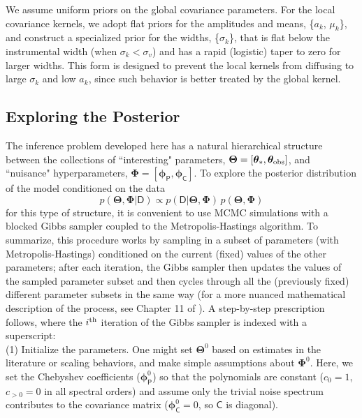 \documentclass[iop,floatfix]{emulateapj}
\newcommand{\vD}{\mathsf{D}}
\newcommand{\vC}{\mathsf{C}}
\newcommand{\vt}{ {\bm \theta}}
\newcommand{\vT}{ {\bm \Theta}}
\newcommand{\vp}{ {\bm \phi}}
\newcommand{\vP}{ {\bm \Phi}}
\newcommand{\cheb}{ \vp_{\mathsf{P}}}
\newcommand{\cov}{ \vp_{\mathsf{C}}}
\begin{document}
We assume uniform priors on the global covariance parameters.  For the local
covariance kernels, we adopt flat priors for the amplitudes and means, \{$a_k$,
$\mu_k$\}, and construct a specialized prior for the widths, \{$\sigma_k$\},
that is flat below the instrumental width (when $\sigma_k < \sigma_v$) and has
a rapid (logistic) taper to zero for larger widths.  This form is designed to
prevent the local kernels from diffusing to large $\sigma_k$ and low $a_k$,
since such behavior is better treated by the global kernel.  


\subsection{Exploring the Posterior} \label{subsec:MCMC}

The inference problem developed here has a natural hierarchical structure between the collections 
of ``interesting" parameters, $\vT = [\vt_{\ast}, \vt_{\rm obs}]$, and ``nuisance" hyperparameters, 
$\vP = [\cheb, \cov]$.  To explore the posterior distribution of the model conditioned on the data
\begin{equation} \label{eqn:post}
p(\vT, \vP | \vD) \propto p(\vD | \vT, \vP) \, p(\vT, \vP)
\end{equation}
for this type of structure, it is convenient to use MCMC simulations with a blocked Gibbs 
sampler coupled to the Metropolis-Hastings algorithm.  To summarize, this procedure works by 
sampling in a subset of parameters (with Metropolis-Hastings) conditioned on the current (fixed) 
values of the other parameters; after each iteration, the Gibbs sampler then updates the values of 
the sampled parameter subset and then cycles through all the (previously fixed) different parameter 
subsets in the same way (for a more nuanced mathematical description of the process, see Chapter 11 
of \citealt{gelman13}).  A step-by-step prescription follows, where the $i^{\rm th}$ 
iteration of the Gibbs sampler is indexed with a superscript: \\

\noindent (1) Initialize the parameters.  One might set $\vT^0$ based on estimates in the 
literature or scaling behaviors, and make simple assumptions about $\vP^0$.  Here, we set the 
Chebyshev coefficients ($\cheb^0$) so that the polynomials are constant ($c_0 = 1$,  $c_{>0} = 0$ 
in all spectral orders) and assume only the trivial noise spectrum contributes to the covariance 
matrix ($\cov^0 = 0$, so $\vC$ is diagonal).  \\
\end{document}
